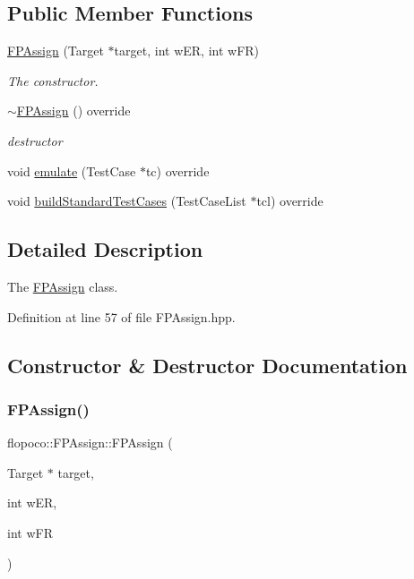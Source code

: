 \subsection*{Public Member Functions}
\begin{DoxyCompactItemize}
\item 
\hyperlink{classflopoco_1_1FPAssign_a2646885528fadfe335940ba0f091bb74}{F\+P\+Assign} (Target $\ast$target, int w\+ER, int w\+FR)
\begin{DoxyCompactList}\small\item\em The constructor. \end{DoxyCompactList}\item 
\hyperlink{classflopoco_1_1FPAssign_a29a88061e13eeabef4a84a496ced7f95}{$\sim$\+F\+P\+Assign} () override
\begin{DoxyCompactList}\small\item\em destructor \end{DoxyCompactList}\item 
void \hyperlink{classflopoco_1_1FPAssign_a9e0bbf237f25b43ec8c3b64e3e04dbc5}{emulate} (Test\+Case $\ast$tc) override
\item 
void \hyperlink{classflopoco_1_1FPAssign_a0cfb17eec1c3c5f27009a0fb5a8e34b7}{build\+Standard\+Test\+Cases} (Test\+Case\+List $\ast$tcl) override
\end{DoxyCompactItemize}


\subsection{Detailed Description}
The \hyperlink{classflopoco_1_1FPAssign}{F\+P\+Assign} class. 

Definition at line 57 of file F\+P\+Assign.\+hpp.



\subsection{Constructor \& Destructor Documentation}
\mbox{\label{classflopoco_1_1FPAssign_a2646885528fadfe335940ba0f091bb74}} 
\subsubsection{\texorpdfstring{F\+P\+Assign()}{FPAssign()}}
{\footnotesize\ttfamily flopoco\+::\+F\+P\+Assign\+::\+F\+P\+Assign (\begin{DoxyParamCaption}\item[{Target $\ast$}]{target,  }\item[{int}]{w\+ER,  }\item[{int}]{w\+FR }\end{DoxyParamCaption})}



